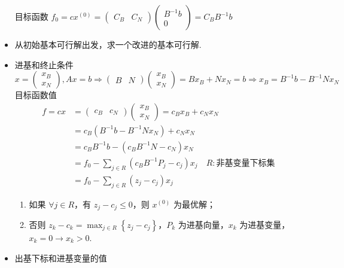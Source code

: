 \begin{note}
\begin{itemize}
            目标函数 $f_0 = cx^{(0)} = \begin{pmatrix}
                C_B & C_N
            \end{pmatrix} \begin{pmatrix}
                B^{-1}b \\
                0
            \end{pmatrix} = C_BB^{-1}b$
        \item 从初始基本可行解出发，求一个改进的基本可行解.
        \item 进基和终止条件
            \[x=\left(\begin{array}{l}
                x_{B} \\
                x_{N}
                \end{array}\right),A x=b \Rightarrow\begin{pmatrix}
                    B & N
                \end{pmatrix}\left(\begin{array}{l}
                x_{B} \\
                x_{N}
                \end{array}\right)=B x_{B}+N x_{N}=b \Rightarrow x_{B}=B^{-1}b-B^{-1} N x_{N}\]
            目标函数值
            \begin{align*}
                f = cx &= \begin{pmatrix}
                    c_B & c_N
                \end{pmatrix}\begin{pmatrix}
                    x_B \\
                    x_N
                \end{pmatrix} = c_Bx_B + c_Nx_N \\
                &= c_B(B^{-1}b - B^{-1}Nx_N) + c_Nx_N \\
                &= c_BB^{-1}b - (c_BB^{-1}N - c_N)x_N \\
                &= f_0 - \sum_{j\in R}(c_BB^{-1}P_j - c_j)x_j \quad R :\text{非基变量下标集} \\
                &=f_0 - \sum_{j\in R}(z_j - c_j)x_j
            \end{align*}
            \begin{enumerate}
                \item 如果 $\forall j\in R$，有 $z_j - c_j \le 0$，则 $x^{(0)}$ 为最优解；
                \item 否则 $z_k - c_k = \max_{j \in R}\left\{z_j - c_j\right\}$，$P_k$ 为进基向量，$x_k$ 为进基变量，$x_k = 0 \to x_k > 0$.
            \end{enumerate}
        \item 出基下标和进基变量的值
        

\end{itemize}
\end{note}
